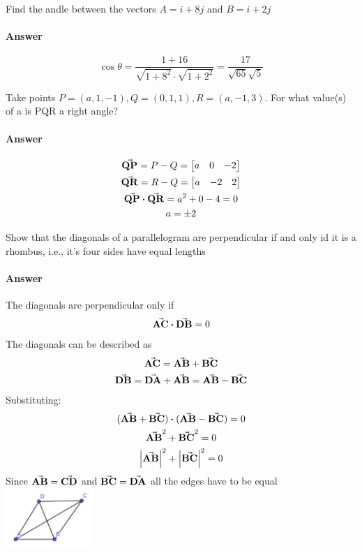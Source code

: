 \documentclass{article}
\begin{document}
    \begin{problem}
        Find the andle between the vectors $A=i+8j$ and $B=i+2j$
        \paragraph{Answer}
        \[
            \cos{\theta}=\frac{1 + 16}{\sqrt{1+8^2}\cdot\sqrt{1+2^2}}=\frac{17}{\sqrt{65}\sqrt{5}}
        \]
    \end{problem}

    \begin{problem}
        Take points $P=(a, 1, -1), Q=(0,1,1),R=(a,-1,3)$. For what value(s) of a is PQR a right angle?
        \paragraph{Answer}
        \begin{gather}
            \va{QP}=P-Q=\bmqty{a & 0 & -2}\\
            \va{QR}=R-Q=\bmqty{a & -2 & 2}\\
            \va{QP}\vdot\va{QR}=a^2 + 0 - 4 = 0\\
            a=\pm2
        \end{gather}
    \end{problem}

    \begin{problem}
        Show that the diagonals of a parallelogram are perpendicular if and only id it is a rhombus, i.e., it's four sides have equal lengths
        \paragraph{Answer}
        The diagonals are perpendicular only if
        \begin{gather}
            \va{AC}\vdot\va{DB}=0\\
        \end{gather}
        The diagonals can be described as
        \begin{gather}
            \va{AC}=\va{AB} + \va{BC}\\
            \va{DB}=\va{DA} + \va{AB} = \va{AB} - \va{BC}\\
        \end{gather}
        Substituting:
        \begin{gather}
            (\va{AB} + \va{BC})\vdot(\va{AB} - \va{BC})=0\\
            \va{AB}^2 + \va{BC}^2 = 0\\
            \abs{\va{AB}}^2 + \abs{\va{BC}}^2 = 0
        \end{gather}
        Since $\va{AB} = \va{CD}$ and $\va{BC} = \va{DA}$ all the edges have to be equal
        \includegraphics[width=0.25\textwidth]{fig_2.png}


    \end{problem}
\end{document}
